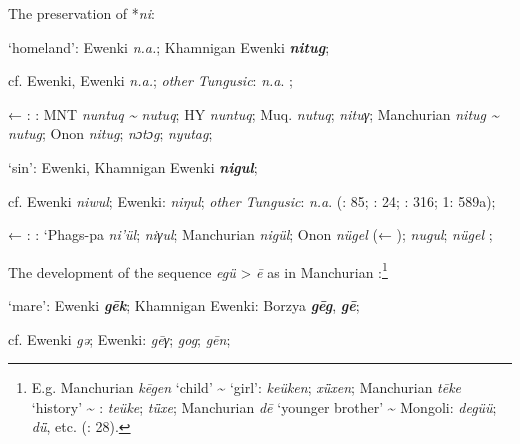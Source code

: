\documentclass[output=paper,colorlinks,citecolor=brown]{langscibook}
\begin{document}
\z

    \ex The preservation of  *\textit{ni}:

\ea ‘homeland’:  Ewenki \textit{n.a.}; Khamnigan Ewenki \textbf{\textit{nitug}};

    cf.  Ewenki,  Ewenki \textit{n.a.}; \textit{other Tungusic}: \textit{n.a}. \citep[24]{Janhunen1991};

    ← : : MNT \textit{nuntuq {\textasciitilde} nutuq}; HY \textit{nuntuq}; Muq. \textit{nutuq};  \textit{nituγ}; Manchurian  \textit{nitug {\textasciitilde} nutug}; Onon  \textit{nitug};  \textit{nɔtɔg};  \textit{nyutag};

    \ex ‘sin’:  Ewenki, Khamnigan Ewenki \textbf{\textit{nigul}};

    cf.  Ewenki \textit{niw​ul};  Ewenki:  \textit{niŋul}; \textit{other Tungusic}: \textit{n.a}. (\citealt{Castrén1856}: 85; \citealt{Janhunen1991}: 24; \citealt{Chaoke2014bB}: 316; \citealt{Cincius1975B} 1: 589a);

    ← : : ‘Phags-pa \textit{ni’ül};  \textit{niγul}; Manchurian  \textit{nigül}; Onon  \textit{nügel} (← );  \textit{nugul};  \textit{nügel} \citep[120]{Khabtagaeva2017};

\z
    \ex The development of the  sequence \textit{egü} > \textit{ē} as in Manchurian :\footnote{E.g. Manchurian  \textit{kēgen} ‘child’ {\textasciitilde}  ‘girl’:  \textit{keüken};  \textit{xǖxen}; Manchurian  \textit{tēke} ‘history’ {\textasciitilde} :  \textit{teüke};  \textit{tǖxe}; Manchurian  \textit{dē} ‘younger brother’ {\textasciitilde} Mongoli:  \textit{degüü};  \textit{dǖ}, etc. (\citealt{Janhunen1990}: 28).}

\ea ‘mare’:  Ewenki \textbf{\textit{gēk}}; Khamnigan Ewenki: Borzya \textbf{\textit{gēg}},  \textbf{\textit{gē}};

    cf.  Ewenki \textit{gǝ};  Ewenki:  \textit{gēγ};  \textit{gog};  \textit{gēn};
\end{document}
